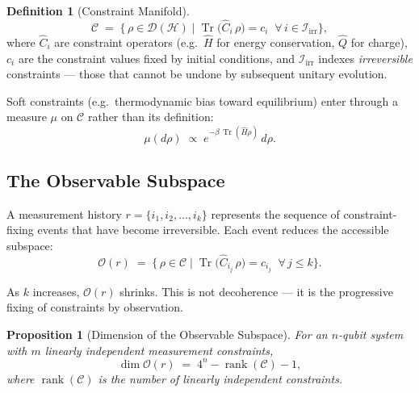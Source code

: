 \documentclass[12pt,letterpaper]{article}
\theoremstyle{plain}
\newtheorem{proposition}[theorem]{Proposition}
\theoremstyle{definition}
\newtheorem{definition}[theorem]{Definition}
\newcommand{\Dens}{\mathcal{D}(\mathcal{H})}
\newcommand{\Cman}{\mathcal{C}}
\newcommand{\Obs}{\mathcal{O}}
\newcommand{\tr}{\operatorname{Tr}}
\begin{document}
\begin{definition}[Constraint Manifold]
\label{def:manifold}
\begin{equation}
  \Cman
  \;=\;
  \bigl\{\,\rho \in \Dens
      \;\big|\;
      \tr\!\bigl(\hat{C}_{i}\,\rho\bigr) = c_{i}
      \;\;\forall\, i \in \mathcal{I}_{\mathrm{irr}}
  \bigr\},
  \label{eq:constraint-manifold}
\end{equation}
where $\hat{C}_{i}$ are constraint operators (e.g.\ $\hat{H}$ for energy conservation,
$\hat{Q}$ for charge), $c_{i}$ are the constraint values fixed by initial conditions, and
$\mathcal{I}_{\mathrm{irr}}$ indexes \emph{irreversible} constraints --- those that cannot be
undone by subsequent unitary evolution.
\end{definition}

Soft constraints (e.g.\ thermodynamic bias toward equilibrium) enter through a measure $\mu$
on $\Cman$ rather than its definition:
\begin{equation}
  \mu(d\rho)
  \;\propto\;
  e^{-\beta\,\tr(\hat{H}\rho)}\,d\rho.
  \label{eq:soft-constraint}
\end{equation}

\subsection{The Observable Subspace}

A measurement history $r = \{i_{1}, i_{2}, \ldots, i_{k}\}$ represents the sequence of
constraint-fixing events that have become irreversible.  Each event reduces the accessible
subspace:
\begin{equation}
  \Obs(r)
  \;=\;
  \bigl\{\,\rho \in \Cman
      \;\big|\;
      \tr\!\bigl(\hat{C}_{i_{j}}\,\rho\bigr) = c_{i_{j}}
      \;\;\forall\, j \leq k
  \bigr\}.
  \label{eq:observable-subspace}
\end{equation}

As $k$ increases, $\Obs(r)$ shrinks.  This is not decoherence --- it is the progressive fixing
of constraints by observation.

\begin{proposition}[Dimension of the Observable Subspace]
\label{prop:dimension}
For an $n$-qubit system with $m$ linearly independent measurement constraints,
\begin{equation}
  \dim\Obs(r)
  \;=\;
  4^{n} - \operatorname{rank}(\mathcal{C}) - 1,
  \label{eq:dim}
\end{equation}
where $\operatorname{rank}(\mathcal{C})$ is the number of linearly independent constraints.
\end{proposition}
\end{document}
